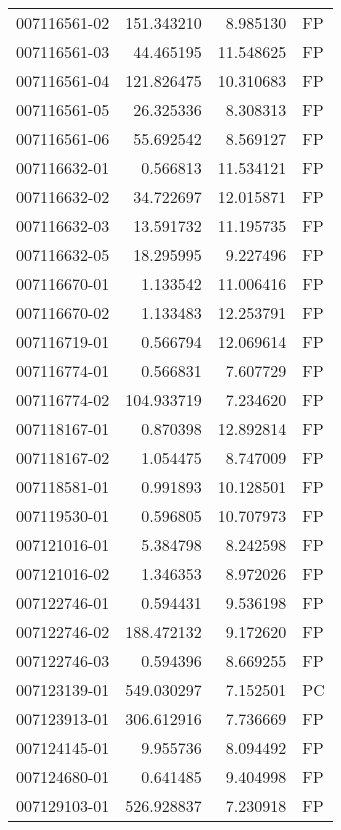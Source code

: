 \begin{tabular}{lrrl}
007116561-02 &  151.343210 &       8.985130 &   FP \\
007116561-03 &   44.465195 &      11.548625 &   FP \\
007116561-04 &  121.826475 &      10.310683 &   FP \\
007116561-05 &   26.325336 &       8.308313 &   FP \\
007116561-06 &   55.692542 &       8.569127 &   FP \\
007116632-01 &    0.566813 &      11.534121 &   FP \\
007116632-02 &   34.722697 &      12.015871 &   FP \\
007116632-03 &   13.591732 &      11.195735 &   FP \\
007116632-05 &   18.295995 &       9.227496 &   FP \\
007116670-01 &    1.133542 &      11.006416 &   FP \\
007116670-02 &    1.133483 &      12.253791 &   FP \\
007116719-01 &    0.566794 &      12.069614 &   FP \\
007116774-01 &    0.566831 &       7.607729 &   FP \\
007116774-02 &  104.933719 &       7.234620 &   FP \\
007118167-01 &    0.870398 &      12.892814 &   FP \\
007118167-02 &    1.054475 &       8.747009 &   FP \\
007118581-01 &    0.991893 &      10.128501 &   FP \\
007119530-01 &    0.596805 &      10.707973 &   FP \\
007121016-01 &    5.384798 &       8.242598 &   FP \\
007121016-02 &    1.346353 &       8.972026 &   FP \\
007122746-01 &    0.594431 &       9.536198 &   FP \\
007122746-02 &  188.472132 &       9.172620 &   FP \\
007122746-03 &    0.594396 &       8.669255 &   FP \\
007123139-01 &  549.030297 &       7.152501 &   PC \\
007123913-01 &  306.612916 &       7.736669 &   FP \\
007124145-01 &    9.955736 &       8.094492 &   FP \\
007124680-01 &    0.641485 &       9.404998 &   FP \\
007129103-01 &  526.928837 &       7.230918 &   FP \\

\end{tabular}
